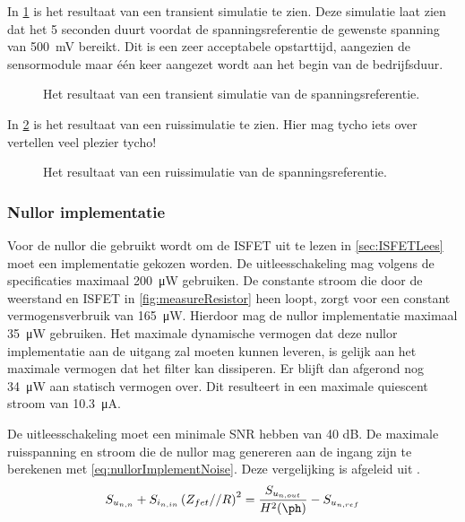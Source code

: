 In \cref{fig:referenceSimTrans} is het resultaat van een transient simulatie te zien. Deze simulatie laat zien dat het 5 seconden duurt voordat de spanningsreferentie de gewenste spanning van \qty{500}{\milli\volt} bereikt. Dit is een zeer acceptabele opstarttijd, aangezien de sensormodule maar één keer aangezet wordt aan het begin van de bedrijfsduur.
\begin{figure}[!htbp]
    \centering
    \pgfplotsset{width=0.7\textwidth}
    
    \caption{Het resultaat van een transient simulatie van de spanningsreferentie.}
    \label{fig:referenceSimTrans}
\end{figure}

In \cref{fig:referenceSimNoise} is het resultaat van een ruissimulatie te zien. Hier mag tycho iets over vertellen veel plezier tycho!%
\begin{figure}[!htbp]
    \centering
    \pgfplotsset{width=0.7\textwidth}
    
    \caption{Het resultaat van een ruissimulatie van de spanningsreferentie.}
    \label{fig:referenceSimNoise}
\end{figure}


\subsubsection{Nullor implementatie}
Voor de nullor die gebruikt wordt om de ISFET uit te lezen in \cref{sec:ISFETLees} moet een implementatie gekozen worden. De uitleesschakeling mag volgens de specificaties maximaal \qty{200}{\micro\watt}  gebruiken. De constante stroom die door de weerstand en ISFET in \cref{fig:measureResistor} heen loopt, zorgt voor een constant vermogensverbruik van \qty{165}{\micro\watt}. Hierdoor mag de nullor implementatie maximaal \qty{35}{\micro\watt} gebruiken. Het maximale dynamische vermogen dat deze nullor implementatie aan de uitgang zal moeten kunnen leveren, is gelijk aan het maximale vermogen dat het filter kan dissiperen. Er blijft dan afgerond nog \qty{34}{\micro\watt} aan statisch vermogen over. Dit resulteert in een maximale quiescent stroom van \qty{10.3}{\micro\ampere}.

De uitleesschakeling moet een minimale SNR hebben van 40 dB. De maximale ruisspanning en stroom die de nullor mag genereren aan de ingang zijn te berekenen met \cref{eq:nullorImplementNoise}. Deze vergelijking is afgeleid uit .
\begin{equation} \label{eq:nullorImplementNoise}
    S_{u_{{n,n}}} + S_{i_{{n,in}}}\left(Z_{fet} // R\right)^2 = \frac{S_{u_{{n,out}}}}{H^2(\ph)} - S_{u_{{n,ref}}}
\end{equation}

